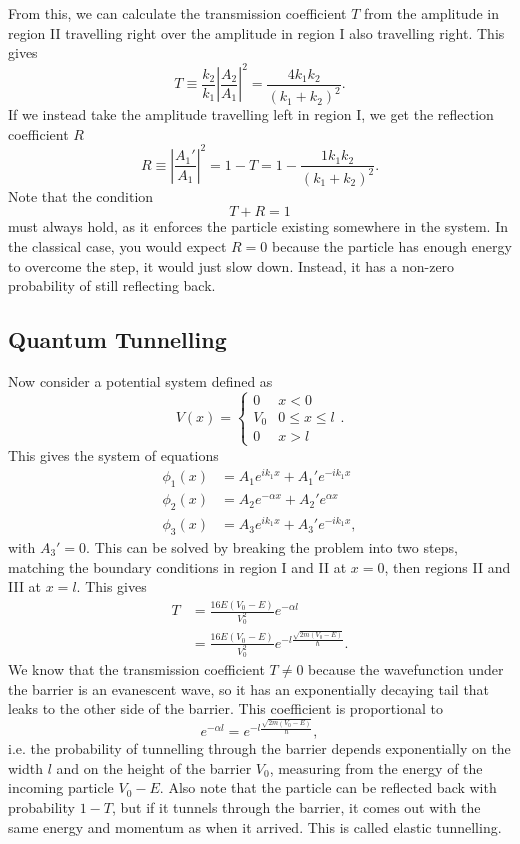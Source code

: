 \documentclass{article}
\begin{document}
From this, we can calculate the transmission coefficient $T$ from the amplitude in region II travelling right over the amplitude in region I also travelling right. This gives
\[
    T\equiv \frac{k_2}{k_1}\left| \frac{A_2}{A_1}\right|^2=\frac{4k_1k_2}{(k_1+k_2)^2}.
\]
If we instead take the amplitude travelling left in region I, we get the reflection coefficient $R$
\[
    R\equiv \left| \frac{A_1'}{A_1} \right|^2=1-T=1-\frac{1k_1k_2}{(k_1+k_2)^2}.
\]
Note that the condition
\[
    T+R=1
\]
must always hold, as it enforces the particle existing somewhere in the system. In the classical case, you would expect $R=0$ because the particle has enough energy to overcome the step, it would just slow down. Instead, it has a non-zero probability of still reflecting back.

\subsection{Quantum Tunnelling}
Now consider a potential system defined as
\[
    V(x)=\begin{cases}
        0 & x<0 \\
        V_0 & 0\leq x\leq l \\
        0 & x>l
    \end{cases}.
\]
This gives the system of equations
\begin{align*}
    \phi _1(x) &= A_1e^{ik_1x}+A_1'e^{-ik_1x} \\
    \phi _2(x) &= A_2e^{-\alpha x}+A_2'e^{\alpha x} \\
    \phi _3(x) &= A_3e^{ik_1x}+A_3'e^{-ik_1x},
\end{align*}
with $A_3'=0$. This can be solved by breaking the problem into two steps, matching the boundary conditions in region I and II at $x=0$, then regions II and III at $x=l$. This gives
\begin{align*}
    T &= \frac{16E(V_0-E)}{V_0^2}e^{-\alpha l} \\
      &= \frac{16E(V_0-E)}{V_0^2}e^{-l \frac{\sqrt{2m(V_0-E)}}{\hbar}}.
\end{align*}
We know that the transmission coefficient $T\neq 0$ because the wavefunction under the barrier is an evanescent wave, so it has an exponentially decaying tail that leaks to the other side of the barrier. This coefficient is proportional to
\[
    e^{-\alpha l}=e^{-l \frac{\sqrt{2m(V_0-E)}}{\hbar}},
\]
i.e. the probability of tunnelling through the barrier depends exponentially on the width $l$ and on the height of the barrier $V_0$, measuring from the energy of the incoming particle $V_0-E$. Also note that the particle can be reflected back with probability $1-T$, but if it tunnels through the barrier, it comes out with the same energy and momentum as when it arrived. This is called elastic tunnelling.
\end{document}
